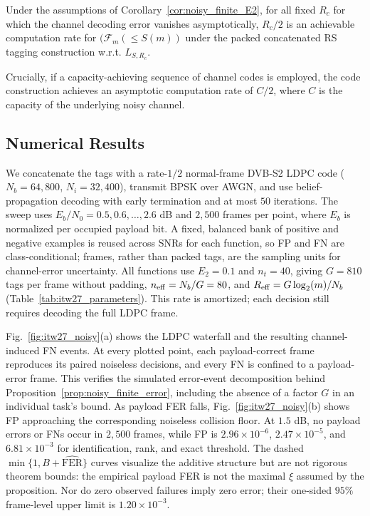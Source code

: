 \begin{corollary}
    Under the assumptions of Corollary~\ref{cor:noisy_finite_E2}, for all fixed $R_c$ for which the channel decoding error vanishes asymptotically, $R_c/2$ is an achievable computation rate for $(\mathcal{F}_m(\leq S(m))$ under the packed concatenated RS tagging construction w.r.t. $L_{S,R_c}$.
\end{corollary}
Crucially, if a capacity-achieving sequence of channel codes is employed, the code construction achieves an asymptotic computation rate of $C/2$, where $C$ is the capacity of the underlying noisy channel.




\subsection{Numerical Results}
\label{sec:noisy_numerical}
We concatenate the tags with a rate-$1/2$ normal-frame DVB-S2 LDPC code
($N_b=64{,}800$, $N_i=32{,}400$), transmit BPSK over AWGN, and use
belief-propagation decoding with early termination and at most $50$
iterations. The sweep uses $E_b/N_0=0.5,0.6,\ldots,2.6$ dB and $2{,}500$
frames per point, where $E_b$ is normalized per occupied payload bit. A
fixed, balanced bank of positive and negative examples is reused across
SNRs for each function, so FP and FN are class-conditional; frames, rather
than packed tags, are the sampling units for channel-error uncertainty.
All functions use $E_2=0.1$ and $n_t=40$, giving $G=810$ tags per frame
without padding, $n_{\rm eff}=N_b/G=80$, and
$R_{\rm eff}=G\log_2(m)/N_b$ (Table~\ref{tab:itw27_parameters}). This rate
is amortized; each decision still requires decoding the full LDPC frame.

Fig.~\ref{fig:itw27_noisy}(a) shows the LDPC waterfall and the resulting
channel-induced FN events. At every plotted point, each payload-correct
frame reproduces its paired noiseless decisions, and every FN is confined
to a payload-error frame. This verifies the simulated error-event
decomposition behind Proposition~\ref{prop:noisy_finite_error}, including
the absence of a factor $G$ in an individual task's bound. As payload FER falls,
Fig.~\ref{fig:itw27_noisy}(b) shows FP approaching the corresponding
noiseless collision floor. At $1.5$ dB, no payload errors or FNs occur in
$2{,}500$ frames, while FP is $2.96\times10^{-6}$, $2.47\times10^{-5}$,
and $6.81\times10^{-3}$ for identification, rank, and exact threshold.
The dashed $\min\{1,B+\widehat{\mathrm{FER}}\}$ curves visualize the
additive structure but are not rigorous theorem bounds: the empirical
payload FER is not the maximal $\xi$ assumed by the proposition. Nor do
zero observed failures imply zero error; their one-sided $95\%$ frame-level
upper limit is $1.20\times10^{-3}$.

